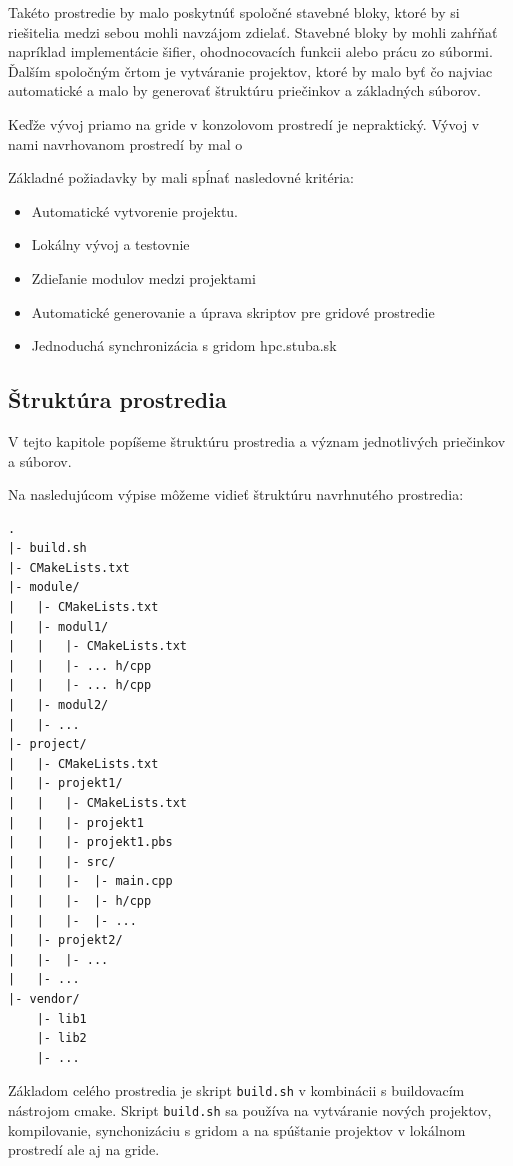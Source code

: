 Takéto prostredie by malo poskytnúť spoločné stavebné bloky, ktoré by si riešitelia medzi sebou mohli navzájom zdielať.
Stavebné bloky by mohli zahŕňať napríklad implementácie šifier, ohodnocovacích funkcii alebo prácu zo súbormi.
Ďalším spoločným črtom je vytváranie projektov, ktoré by malo byť čo najviac automatické a malo by generovať štruktúru priečinkov a základných súborov.

Keďže vývoj priamo na gride v konzolovom prostredí je nepraktický. Vývoj v nami navrhovanom prostredí by mal o

Základné požiadavky by mali spĺnať nasledovné kritéria:
\begin{itemize}
\item
  Automatické vytvorenie projektu.
\item
  Lokálny vývoj a testovnie
\item
  Zdieľanie modulov medzi projektami
\item
  Automatické generovanie a úprava skriptov pre gridové prostredie
\item
  Jednoduchá synchronizácia s gridom hpc.stuba.sk
\end{itemize}

\subsection{Štruktúra prostredia}
V tejto kapitole popíšeme štruktúru prostredia a význam jednotlivých priečinkov a súborov.

Na nasledujúcom výpise môžeme vidieť štruktúru navrhnutého prostredia:
\begin{lstlisting}[caption={Štruktúra prostredia}, label={prop:struktura}]
.
|- build.sh
|- CMakeLists.txt
|- module/
|   |- CMakeLists.txt
|   |- modul1/
|   |   |- CMakeLists.txt
|   |   |- ... h/cpp
|   |   |- ... h/cpp
|   |- modul2/
|   |- ...
|- project/
|   |- CMakeLists.txt
|   |- projekt1/
|   |   |- CMakeLists.txt
|   |   |- projekt1
|   |   |- projekt1.pbs
|   |   |- src/
|   |   |-  |- main.cpp
|   |   |-  |- h/cpp
|   |   |-  |- ...
|   |- projekt2/
|   |-  |- ...
|   |- ...
|- vendor/
    |- lib1
    |- lib2
    |- ...
\end{lstlisting}
  
Základom celého prostredia je skript \texttt{build.sh} v kombinácii s buildovacím nástrojom cmake. Skript \texttt{build.sh} sa používa na vytváranie nových projektov, kompilovanie, synchonizáciu s gridom a na spúštanie projektov v lokálnom prostredí ale aj na gride.

